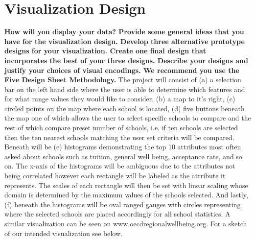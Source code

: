 \documentclass[11pt, a4paper]{article}
\begin{document}
  \section{Visualization Design}
  \textbf{ How will you display your data? Provide some general ideas that you have for the visualization design. Develop three alternative prototype designs for your visualization. Create one final design that incorporates the best of your three designs. Describe your designs and justify your choices of visual encodings. We recommend you use the Five Design Sheet Methodology.}
  The project will consist of (a) a selection bar on the left hand side where the user is able to determine which features and for what range values they would like to consider, (b) a map to it's right, (c) circled points on the map where each school is located, (d) five buttons beneath the map one of which allows the user to select specific schools to compare and the rest of which compare preset number of schools, i.e. if ten schools are selected then the ten nearest schools matching the user set criteria will be compared. Beneath will be (e) histograms demonstrating the top 10 attributes most often asked about schools such as tuition, general well being, acceptance rate, and so on. The x-axis of the histograms will be ambiguous due to the attributes not being correlated however each rectangle will be labeled as the attribute it represents. The scales of each rectangle will then be set with linear scaling whose domain is determined by the maximum values of the schools selected. And lastly, (f) beneath the histograms will be oval ranged gauges with circles representing where the selected schools are placed accordingly for all school statistics. A similar visualization can be seen on \href{https://www.oecdregionalwellbeing.org}{www.oecdregionalwellbeing.org}. For a sketch of our intended visualization see below.  
\end{document}
